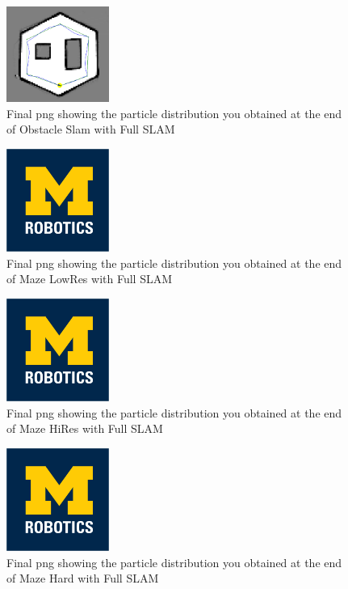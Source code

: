 \documentclass[journal,onecolumn]{IEEEtran}
\begin{document}
\begin{figure}[H]
\centering
\includegraphics[width=0.3\textwidth]{Media/131.png}
\caption{Final png showing the particle distribution you obtained at the end of Obstacle Slam with Full SLAM}
\end{figure}

\begin{figure}[H]
\centering
\includegraphics[width=0.3\textwidth]{Media/template-robotics.jpg}
\caption{Final png showing the particle distribution you obtained at the end of Maze LowRes with Full SLAM}
\end{figure}

\begin{figure}[H]
\centering
\includegraphics[width=0.3\textwidth]{Media/template-robotics.jpg}
\caption{Final png showing the particle distribution you obtained at the end of Maze HiRes with Full SLAM}
\end{figure}

\begin{figure}[H]
\centering
\includegraphics[width=0.3\textwidth]{Media/template-robotics.jpg}
\caption{Final png showing the particle distribution you obtained at the end of Maze Hard with Full SLAM}
\end{figure}
\end{document}
